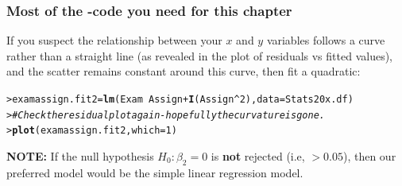 \documentclass{beamer}\usepackage[]{graphicx}\usepackage[]{xcolor}
\makeatletter
\newcommand{\hlnum}[1]{\textcolor[rgb]{0.686,0.059,0.569}{#1}}%
\newcommand{\hlcom}[1]{\textcolor[rgb]{0.678,0.584,0.686}{\textit{#1}}}%
\newcommand{\hlopt}[1]{\textcolor[rgb]{0,0,0}{#1}}%
\newcommand{\hlstd}[1]{\textcolor[rgb]{0.345,0.345,0.345}{#1}}%
\newcommand{\hlkwb}[1]{\textcolor[rgb]{0.69,0.353,0.396}{#1}}%
\newcommand{\hlkwc}[1]{\textcolor[rgb]{0.333,0.667,0.333}{#1}}%
\newcommand{\hlkwd}[1]{\textcolor[rgb]{0.737,0.353,0.396}{\textbf{#1}}}%
\newenvironment{kframe}{%
 \def\at@end@of@kframe{}%
 \ifinner\ifhmode%
  \def\at@end@of@kframe{\end{minipage}}%
  \begin{minipage}{\columnwidth}%
 \fi\fi%
 \def\FrameCommand##1{\hskip\@totalleftmargin \hskip-\fboxsep
 \colorbox{shadecolor}{##1}\hskip-\fboxsep
     \hskip-\linewidth \hskip-\@totalleftmargin \hskip\columnwidth}%
 \MakeFramed {\advance\hsize-\width
   \@totalleftmargin\z@ \linewidth\hsize
   \@setminipage}}%
 {\par\unskip\endMakeFramed%
 \at@end@of@kframe}
\newenvironment{knitrout}{}{} %
\makeatother
\begin{document}
\begin{frame}[fragile]
\frametitle{Most of the -code you need for this chapter}

If you suspect the relationship between your $x$ and $y$ variables follows a curve rather than a straight line (as revealed in the plot of residuals vs fitted values), and the scatter remains constant around this curve, then fit a quadratic:
\bigskip

\begin{knitrout}\scriptsize
{}\color{fgcolor}\begin{kframe}
\begin{alltt}
\hlstd{> }\hlstd{examassign.fit2}\hlkwb{=}\hlkwd{lm}\hlstd{(Exam}\hlopt{~} \hlstd{Assign} \hlopt{+} \hlkwd{I}\hlstd{(Assign}\hlopt{^}\hlnum{2}\hlstd{),} \hlkwc{data} \hlstd{= Stats20x.df)}
\hlstd{> }\hlcom{#Check the residual plot again - hopefully the curvature is gone.}
\hlstd{> }\hlkwd{plot}\hlstd{(examassign.fit2,}\hlkwc{which}\hlstd{=}\hlnum{1}\hlstd{)}
\end{alltt}
\end{kframe}
\end{knitrout}
\bigskip

{\bf NOTE:} If the null hypothesis $H_0: \beta_2=0$ is {\bf not} rejected (i.e, \pval{}$>0.05$), then our preferred model would be the simple linear regression model.
\end{frame}
\end{document}
